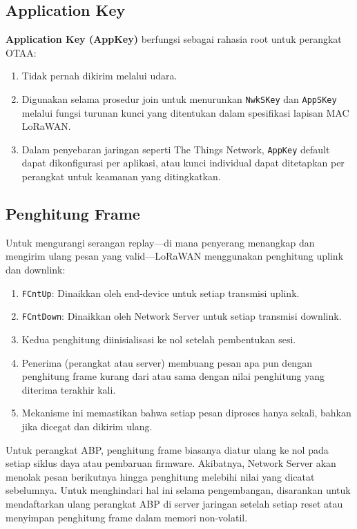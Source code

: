 \subsection{Application Key}
\textbf{Application Key (AppKey)} berfungsi sebagai rahasia root untuk perangkat OTAA:
\begin{enumerate}
    \item Tidak pernah dikirim melalui udara.
    \item Digunakan selama prosedur join untuk menurunkan \texttt{NwkSKey} dan \texttt{AppSKey} melalui fungsi turunan kunci yang ditentukan dalam spesifikasi lapisan MAC LoRaWAN.
    \item Dalam penyebaran jaringan seperti The Things Network, \texttt{AppKey} default dapat dikonfigurasi per aplikasi, atau kunci individual dapat ditetapkan per perangkat untuk keamanan yang ditingkatkan.
\end{enumerate}
\subsection{Penghitung Frame}
Untuk mengurangi serangan replay—di mana penyerang menangkap dan mengirim ulang pesan yang valid—LoRaWAN menggunakan penghitung uplink dan downlink:
\begin{enumerate}
    \item \texttt{FCntUp}: Dinaikkan oleh end-device untuk setiap transmisi uplink.
    \item \texttt{FCntDown}: Dinaikkan oleh Network Server untuk setiap transmisi downlink.
    \item Kedua penghitung diinisialisasi ke nol setelah pembentukan sesi.
    \item Penerima (perangkat atau server) membuang pesan apa pun dengan penghitung frame kurang dari atau sama dengan nilai penghitung yang diterima terakhir kali.
    \item Mekanisme ini memastikan bahwa setiap pesan diproses hanya sekali, bahkan jika dicegat dan dikirim ulang.
\end{enumerate}
Untuk perangkat ABP, penghitung frame biasanya diatur ulang ke nol pada setiap siklus daya atau pembaruan firmware. Akibatnya, Network Server akan menolak pesan berikutnya hingga penghitung melebihi nilai yang dicatat sebelumnya. Untuk menghindari hal ini selama pengembangan, disarankan untuk mendaftarkan ulang perangkat ABP di server jaringan setelah setiap reset atau menyimpan penghitung frame dalam memori non-volatil.
